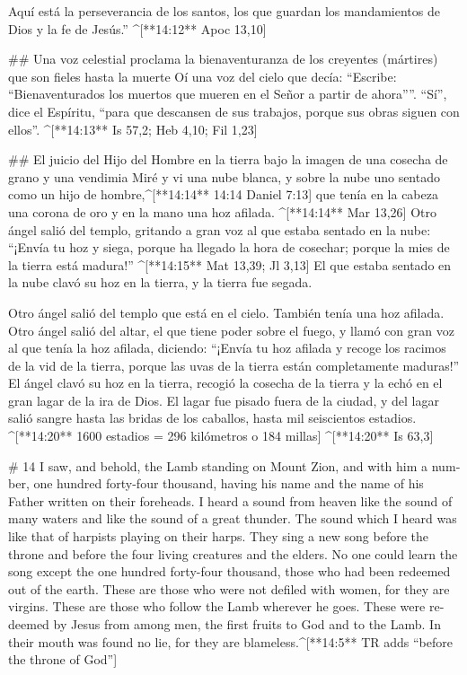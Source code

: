 \begin{paracols}{2}
 Aquí está la perseverancia de los santos, los que guardan los mandamientos de Dios y la fe de Jesús.” ^[**14:12** Apoc 13,10]

## Una voz celestial proclama la bienaventuranza de los creyentes (mártires) que son fieles hasta la muerte
 Oí una voz del cielo que decía: “Escribe: “Bienaventurados los muertos que mueren en el Señor a partir de ahora””. “Sí”, dice el Espíritu, “para que descansen de sus trabajos, porque sus obras siguen con ellos”. ^[**14:13** Is 57,2; Heb 4,10; Fil 1,23]

## El juicio del Hijo del Hombre en la tierra bajo la imagen de una cosecha de grano y una vendimia
 Miré y vi una nube blanca, y sobre la nube uno sentado como un hijo de hombre,^[**14:14** 14:14 Daniel 7:13] que tenía en la cabeza una corona de oro y en la mano una hoz afilada. ^[**14:14** Mar 13,26]  Otro ángel salió del templo, gritando a gran voz al que estaba sentado en la nube: “¡Envía tu hoz y siega, porque ha llegado la hora de cosechar; porque la mies de la tierra está madura!” ^[**14:15** Mat 13,39; Jl 3,13]  El que estaba sentado en la nube clavó su hoz en la tierra, y la tierra fue segada.

 Otro ángel salió del templo que está en el cielo. También tenía una hoz afilada.  Otro ángel salió del altar, el que tiene poder sobre el fuego, y llamó con gran voz al que tenía la hoz afilada, diciendo: “¡Envía tu hoz afilada y recoge los racimos de la vid de la tierra, porque las uvas de la tierra están completamente maduras!”  El ángel clavó su hoz en la tierra, recogió la cosecha de la tierra y la echó en el gran lagar de la ira de Dios.  El lagar fue pisado fuera de la ciudad, y del lagar salió sangre hasta las bridas de los caballos, hasta mil seiscientos estadios. ^[**14:20** 1600 estadios = 296 kilómetros o 184 millas] ^[**14:20** Is 63,3]

\switchcolumn
\begin{english}

# 14
 I saw, and behold, the Lamb standing on Mount Zion, and with him a number, one hundred forty-four thousand, having his name and the name of his Father written on their foreheads.  I heard a sound from heaven like the sound of many waters and like the sound of a great thunder. The sound which I heard was like that of harpists playing on their harps.  They sing a new song before the throne and before the four living creatures and the elders. No one could learn the song except the one hundred forty-four thousand, those who had been redeemed out of the earth.  These are those who were not defiled with women, for they are virgins. These are those who follow the Lamb wherever he goes. These were redeemed by Jesus from among men, the first fruits to God and to the Lamb.  In their mouth was found no lie, for they are blameless.^[**14:5** TR adds “before the throne of God”] 


\end{english}
\end{paracols}
